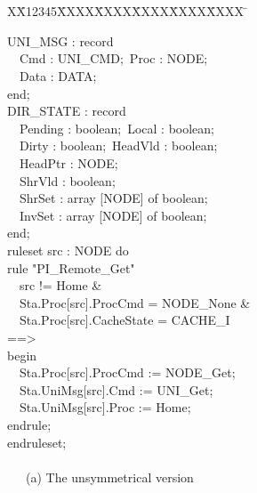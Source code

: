 \documentclass{llncs-new}
\newlength{\fminilength}
\newenvironment{fmini}[1][\linewidth]
  {\setlength{\fminilength}{#1\fboxsep-2\fboxrule}%
   \vspace{2ex}\noindent\begin{lrbox}{\fminibox}\begin{minipage}{\fminilength}%
   \mbox{ }\hfill\vspace{-2.5ex}}%
  {\end{minipage}\end{lrbox}\vspace{1ex}\hspace{0ex}%
   \framebox{\usebox{\fminibox}}}
\newenvironment{specification}
{\noindent\scriptsize
\tt\begin{fmini}\begin{tabbing}X\=X12345\=XXXX\=XXXX\=XXXX\=XXXX\=XXXX
\=\+\kill} {\end{tabbing}\normalfont\end{fmini}}
\def \twoSpaces {\ \ }
\newcommand{\forget}[1]{}
\def \twoSpaces {\ \ }
\begin{document}
\begin{specification}
\begin{minipage}[t]{0.5\linewidth}
 UNI\_MSG : record\\
\indent \twoSpaces \quad  Cmd : UNI\_CMD;\     Proc : NODE;\\
\indent \twoSpaces     Data : DATA;\\
  end;\\
 DIR\_STATE : record\\
\indent \twoSpaces     Pending : boolean;\     Local : boolean;\\
\indent \twoSpaces     Dirty : boolean;\      HeadVld : boolean;\\
\indent \twoSpaces     HeadPtr : NODE;\\
\indent \twoSpaces     ShrVld : boolean;\\
\indent \twoSpaces     ShrSet : array [NODE] of boolean;\\
\indent \twoSpaces     InvSet : array [NODE] of boolean;\\
  end;  \\

  ruleset src : NODE do\\
rule "PI\_Remote\_Get"\\
\indent \twoSpaces  src != Home \&\\
\indent \twoSpaces  Sta.Proc[src].ProcCmd = NODE\_None \&\\
\indent \twoSpaces  Sta.Proc[src].CacheState = CACHE\_I\\
==>\\
begin\\
\indent \twoSpaces    Sta.Proc[src].ProcCmd := NODE\_Get;\\
\indent \twoSpaces    Sta.UniMsg[src].Cmd := UNI\_Get;\\
\indent \twoSpaces    Sta.UniMsg[src].Proc := Home;\\
endrule;\\
endruleset;\\
\twoSpaces \\
\indent  \ \twoSpaces (a) The unsymmetrical version\\
\end{minipage}

\begin{minipage}[t]{0.4\linewidth}


\end{minipage}
\end{specification}
\end{document}
